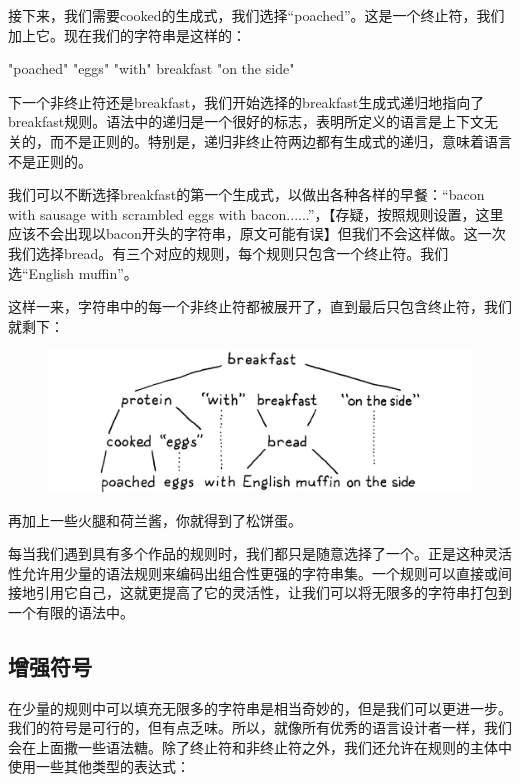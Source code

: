 \documentclass[cn,11pt,chinese]{elegantbook}
\begin{document}
接下来，我们需要cooked的生成式，我们选择“poached”。这是一个终止符，我们加上它。现在我们的字符串是这样的：

\begin{tcolorbox}
"poached" "eggs" "with" breakfast "on the side"
\end{tcolorbox}

下一个非终止符还是breakfast，我们开始选择的breakfast生成式递归地指向了breakfast规则。语法中的递归是一个很好的标志，表明所定义的语言是上下文无关的，而不是正则的。特别是，递归非终止符两边都有生成式的递归，意味着语言不是正则的。

我们可以不断选择breakfast的第一个生成式，以做出各种各样的早餐：“bacon with sausage with scrambled eggs with bacon......”，【存疑，按照规则设置，这里应该不会出现以bacon开头的字符串，原文可能有误】但我们不会这样做。这一次我们选择bread。有三个对应的规则，每个规则只包含一个终止符。我们选“English muffin”。

这样一来，字符串中的每一个非终止符都被展开了，直到最后只包含终止符，我们就剩下：

\begin{figure}[htbp]
  \centering
  \includegraphics[width=\textwidth]{image/representing-code/breakfast.png}
\end{figure}

再加上一些火腿和荷兰酱，你就得到了松饼蛋。

每当我们遇到具有多个作品的规则时，我们都只是随意选择了一个。正是这种灵活性允许用少量的语法规则来编码出组合性更强的字符串集。一个规则可以直接或间接地引用它自己，这就更提高了它的灵活性，让我们可以将无限多的字符串打包到一个有限的语法中。

\subsection{增强符号}

在少量的规则中可以填充无限多的字符串是相当奇妙的，但是我们可以更进一步。我们的符号是可行的，但有点乏味。所以，就像所有优秀的语言设计者一样，我们会在上面撒一些语法糖。除了终止符和非终止符之外，我们还允许在规则的主体中使用一些其他类型的表达式：
\end{document}
